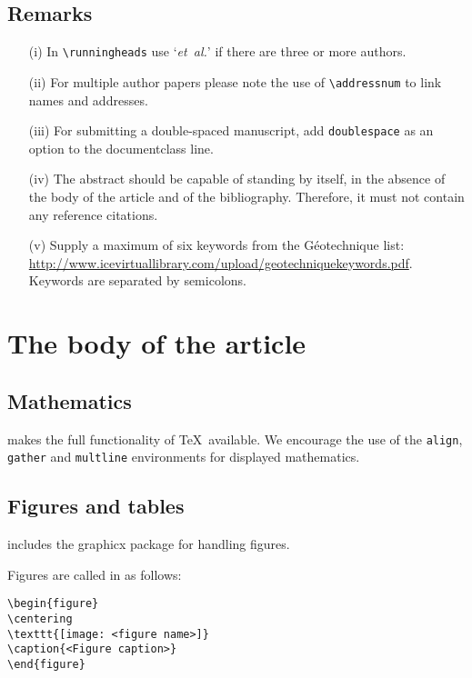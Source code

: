 \documentclass[times]{GeotechAuth}
\begin{document}
\subsection{Remarks}
\begin{enumerate}
\item[(i)] In \verb"\runningheads" use `\emph{et~al.}' if there
are three or more authors.

\item[(ii)] For multiple author papers please note the use of \verb"\addressnum" to
link names and addresses.

\item[(iii)] For submitting a double-spaced manuscript, add
\verb"doublespace" as an option to the documentclass line.

\item[(iv)] The abstract should be capable of standing by itself,
in the absence of the body of the article and of the bibliography.
Therefore, it must not contain any reference citations.

\item[(v)] Supply a maximum of six keywords from the G\'eotechnique list:\\ \url{http://www.icevirtuallibrary.com/upload/geotechniquekeywords.pdf}.
Keywords are separated by semicolons.

\end{enumerate}

\section{The body of the article}

\subsection{Mathematics} \textsf{\journalclass} makes the full
functionality of \AmS\/\TeX\ available. We encourage the use of
the \verb"align", \verb"gather" and \verb"multline" environments
for displayed mathematics.

\subsection{Figures and tables} \textsf{\journalclass} includes the
\textsf{graphicx} package for handling figures.

Figures are called in as follows:
\begin{verbatim}
\begin{figure}
\centering
\texttt{[image: <figure name>]}
\caption{<Figure caption>}
\end{figure}
\end{verbatim}
\end{document}
